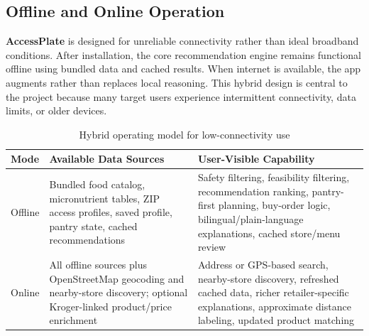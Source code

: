 \documentclass[11pt,letterpaper]{article}
\newcommand{\app}{\textbf{AccessPlate}}
\begin{document}
\subsection{Offline and Online Operation}
\app{} is designed for unreliable connectivity rather than ideal broadband conditions. After installation, the core recommendation engine remains functional offline using bundled data and cached results. When internet is available, the app augments rather than replaces local reasoning. This hybrid design is central to the project because many target users experience intermittent connectivity, data limits, or older devices.

\begin{table}[H]
\centering
\small
\caption{Hybrid operating model for low-connectivity use}
\label{tab:offline-online}
\begin{tabularx}{\linewidth}{>{\raggedright\arraybackslash}p{1.35cm} >{\raggedright\arraybackslash}X >{\raggedright\arraybackslash}X}
\toprule
\textbf{Mode} & \textbf{Available Data Sources} & \textbf{User-Visible Capability} \\
\midrule
Offline &
Bundled food catalog, micronutrient tables, ZIP access profiles, saved profile, pantry state, cached recommendations &
Safety filtering, feasibility filtering, recommendation ranking, pantry-first planning, buy-order logic, bilingual/plain-language explanations, cached store/menu review \\
\addlinespace[2pt]
Online &
All offline sources plus OpenStreetMap geocoding and nearby-store discovery; optional Kroger-linked product/price enrichment &
Address or GPS-based search, nearby-store discovery, refreshed cached data, richer retailer-specific explanations, approximate distance labeling, updated product matching \\
\bottomrule
\end{tabularx}
\end{table}
\end{document}
